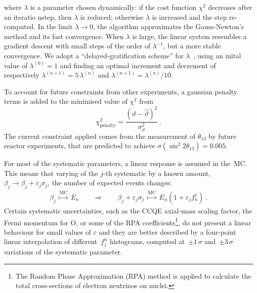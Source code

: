 where $\lambda$ is a parameter chosen dynamically: if the cost function $\chi^2$ decreases %
after an iteratio nstep, then $\lambda$ is reduced; otherwise $\lambda$ is increased and the step re-computed.
In the limit $\lambda \to 0$, the algorithm approximates the Gauss-Newton's method and its fast convergence.
When $\lambda$ is large, the linear system resembles a gradient descent with small steps of the order of $\lambda^{-1}$, %
but a more stable convergence.
We adopt a ``delayed-gratification scheme'' for $\lambda$~\cite{Transtrum2012}, using an inital value of $\lambda^{(0)} = 1$ and finding %
an optimal increment and decrement of respectively $\lambda^{(n+1)} = 5\,\lambda^{(n)}$ and $\lambda^{(n+1)} = \lambda^{(n)} / 10$.

To account for future constraints from other experiments, a gaussian penalty terms is added %
to the minimised value of $\chi^2$ from 
\begin{equation}
	\chi^2_\text{penalty} = \frac{(\vartheta - \hat{\vartheta})^2}{\sigma_\vartheta^2}\ .
\end{equation}
The current constraint applied comes from the measurement of $\theta_{13}$ by future reactor experiments, %
that are predicted to achieve $\sigma(\sin^2 2\theta_{13}) = 0.005$.

For most of the systematic parameters, a linear response is assumed in the~MC.
This means that varying of the $j$-th systematic by a known amount, $\beta_j \to \beta_j + \varepsilon_j\sigma_j$, %
the number of expected events changes:
\begin{align*}
	\beta_j\ \overset{\scriptstyle \text{MC}}{\longmapsto}\ E_n %
	\qquad \Longrightarrow \qquad %
	\beta_j + \varepsilon_j\sigma_j\ \overset{\text{MC}}{\longmapsto}\ E_n ( 1 + \varepsilon_j f_n ^j )\ .
\end{align*}
Certain systematic uncertainties, such as the CCQE axial-mass scaling factor, the Fermi momentum for O, %
or some of the RPA coefficients\footnote{The Random Phase Approximation (RPA) method is applied to calculate the total cross-sections %
	of electron neutrinos on nuclei.}, 
do not present a linear behaviour for small values of $\varepsilon$ %
and they are better described by a four-point linear interpolation of different~$f_j^n$ histograms, %
computed at~$\pm1\,\sigma$ and~$\pm3\,\sigma$ variations of the systematic parameter.

